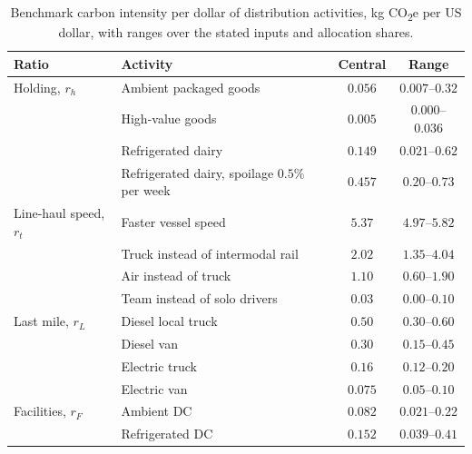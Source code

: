 \documentclass[11pt]{article}
\numberwithin{proposition}{section}
\theoremstyle{definition}
\theoremstyle{remark}
\theoremstyle{plain}
\begin{document}
\begin{table}[t]
\centering\small
\caption{Benchmark carbon intensity per dollar of distribution activities, kg CO\textsubscript{2}e per US dollar,
with ranges over the stated inputs and allocation shares.}
\label{tab:ratios}
\begin{tabular}{@{}llcc@{}}
\toprule
Ratio & Activity & Central & Range\\
\midrule
Holding, $r_h$            & Ambient packaged goods                        & $0.056$ & $0.007$--$0.32$\\
                          & High-value goods                              & $0.005$ & $0.000$--$0.036$\\
                          & Refrigerated dairy                            & $0.149$ & $0.021$--$0.62$\\
                          & Refrigerated dairy, spoilage $0.5\%$ per week & $0.457$ & $0.20$--$0.73$\\
\addlinespace
Line-haul speed, $r_t$    & Faster vessel speed                           & $5.37$  & $4.97$--$5.82$\\
                          & Truck instead of intermodal rail              & $2.02$  & $1.35$--$4.04$\\
                          & Air instead of truck                          & $1.10$  & $0.60$--$1.90$\\
                          & Team instead of solo drivers                  & $0.03$  & $0.00$--$0.10$\\
\addlinespace
Last mile, $r_L$          & Diesel local truck                            & $0.50$  & $0.30$--$0.60$\\
                          & Diesel van                                    & $0.30$  & $0.15$--$0.45$\\
                          & Electric truck                                & $0.16$  & $0.12$--$0.20$\\
                          & Electric van                                  & $0.075$ & $0.05$--$0.10$\\
\addlinespace
Facilities, $r_F$         & Ambient DC                   & $0.082$ & $0.021$--$0.22$\\
                          & Refrigerated DC              & $0.152$ & $0.039$--$0.41$\\
\bottomrule
\end{tabular}
\end{table}
\end{document}
